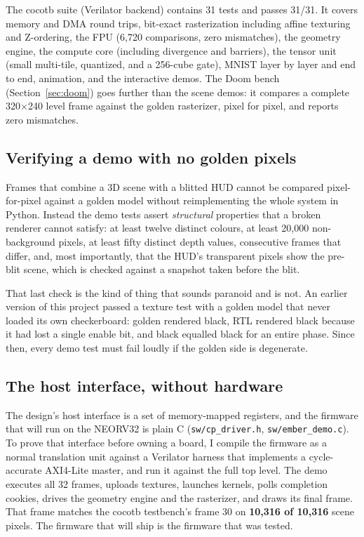 \documentclass[conference]{IEEEtran}
\begin{document}
The cocotb suite (Verilator backend) contains 31 tests and passes 31/31. It
covers memory and DMA round trips, bit-exact rasterization including
affine texturing and Z-ordering, the FPU (6{,}720 comparisons, zero
mismatches), the geometry engine, the compute core (including divergence and
barriers), the tensor unit (small multi-tile, quantized, and a 256-cube gate),
MNIST layer by layer and end to end, animation, and the interactive demos. The
Doom bench (Section~\ref{sec:doom}) goes further than the scene demos: it
compares a complete 320$\times$240 level frame against the golden rasterizer,
pixel for pixel, and reports zero mismatches.

\subsection{Verifying a demo with no golden pixels}

Frames that combine a 3D scene with a blitted HUD cannot be compared
pixel-for-pixel against a golden model without reimplementing the whole system
in Python. Instead the demo tests assert \emph{structural} properties that a
broken renderer cannot satisfy: at least twelve distinct colours, at least
20{,}000 non-background pixels, at least fifty distinct depth values, consecutive
frames that differ, and, most importantly, that the HUD's
transparent pixels show the pre-blit scene, which is checked against a snapshot
taken before the blit.

That last check is the kind of thing that sounds paranoid and is not. An earlier
version of this project passed a texture test with a golden model that never
loaded its own checkerboard: golden rendered black, RTL rendered black because
it had lost a single enable bit, and black equalled black for an entire phase.
Since then, every demo test must fail loudly if the golden side is
degenerate.

\subsection{The host interface, without hardware}

The design's host interface is a set of memory-mapped registers, and the
firmware that will run on the NEORV32 is plain C (\texttt{sw/cp\_driver.h},
\texttt{sw/ember\_demo.c}). To prove that interface before owning a board, I
compile the firmware as a normal translation unit against a Verilator harness
that implements a cycle-accurate AXI4-Lite master, and run it against the full
top level. The demo executes all 32 frames, uploads textures, launches kernels,
polls completion cookies, drives the geometry engine and the rasterizer, and
draws its final frame. That frame matches the cocotb testbench's frame 30 on
\textbf{10{,}316 of 10{,}316} scene pixels. The firmware that will ship is the
firmware that was tested.
\end{document}
